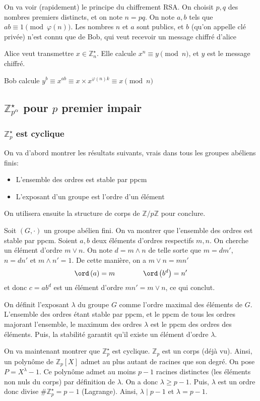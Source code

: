 On va voir (rapidement) le principe du chiffrement RSA. On choisit $p, q$ des nombres premiers distincts, et on note $n=pq$. On note $a, b$ tels que $ab\equiv 1\pmod{\varphi(n)}$. Les nombres $n$ et $a$ sont publics, et $b$ (qu'on appelle clé privée) n'est connu que de Bob, qui veut recevoir un message chiffré d'alice

Alice veut transmettre $x\in\mathbb Z_n^\star$. Elle calcule $x^n\equiv y\pmod n$, et $y$ est le message chiffré.

Bob calcule $y^b\equiv x^{ab}\equiv x\times x^{\varphi(n)k}\equiv x\pmod n$

\subsection{$\mathbb Z_{p^\alpha}^\star$ pour $p$ premier impair}

\subsubsection{$\mathbb Z_p^\star$ est cyclique}

On va d'abord montrer les résultats suivants, vrais dans tous les groupes abéliens finis: \begin{itemize}
    \item L'ensemble des ordres est stable par ppcm
    \item L'exposant d'un groupe est l'ordre d'un élément
\end{itemize}
On utilisera ensuite la structure de corps de $\mathbb Z/p\mathbb Z$ pour conclure.

Soit $(G, \cdot)$ un groupe abélien fini. On va montrer que l'ensemble des ordres est stable par ppcm. Soient $a, b$ deux éléments d'ordres respectifs $m, n$. On cherche un élément d'ordre $m\lor n$. On note $d=m\land n$ de telle sorte que $m=dm'$, $n=dn'$ et $m\land n'=1$. De cette manière, on a $m\lor n=mn'$
\[
    \ord \left(a\right)=m\qquad \qquad \ord\left(b^d\right)=n'
\]
et donc $c=ab^d$ est un élément d'ordre $mn'=m\lor n$, ce qui conclut.

On définit l'exposant $\lambda$ du groupe $G$ comme l'ordre maximal des éléments de $G$. L'ensemble des ordres étant stable par ppcm, et le ppcm de tous les ordres majorant l'ensemble, le maximum des ordres $\lambda$ est le ppcm des ordres des éléments. Puis, la stabilité garantit qu'il existe un élément d'ordre $\lambda$.

On va maintenant montrer que $\mathbb Z_p^\star$ est cyclique. $\mathbb Z_p$ est un corps (déjà vu). Ainsi, un polynôme de $\mathbb Z_p[X]$ admet au plus autant de racines que son degré. On pose $P=X^\lambda-1$. Ce polynôme admet au moins $p-1$ racines distinctes (les éléments non nuls du corps) par définition de $\lambda$. On a donc $\lambda\geq p-1$. Puis, $\lambda$ est un ordre donc divise $\#\mathbb Z_p^\star=p-1$ (Lagrange). Ainsi, $\lambda\mid p-1$ et $\lambda=p-1$.

